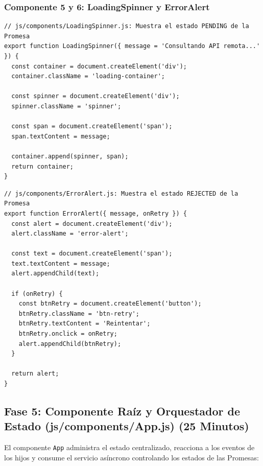 \documentclass[10pt,letterpaper]{article}
\begin{document}
\subsubsection{Componente 5 y 6: LoadingSpinner y ErrorAlert}
\begin{lstlisting}[style=jsstyle]
// js/components/LoadingSpinner.js: Muestra el estado PENDING de la Promesa
export function LoadingSpinner({ message = 'Consultando API remota...' }) {
  const container = document.createElement('div');
  container.className = 'loading-container';

  const spinner = document.createElement('div');
  spinner.className = 'spinner';

  const span = document.createElement('span');
  span.textContent = message;

  container.append(spinner, span);
  return container;
}
\end{lstlisting}

\begin{lstlisting}[style=jsstyle]
// js/components/ErrorAlert.js: Muestra el estado REJECTED de la Promesa
export function ErrorAlert({ message, onRetry }) {
  const alert = document.createElement('div');
  alert.className = 'error-alert';

  const text = document.createElement('span');
  text.textContent = message;
  alert.appendChild(text);

  if (onRetry) {
    const btnRetry = document.createElement('button');
    btnRetry.className = 'btn-retry';
    btnRetry.textContent = 'Reintentar';
    btnRetry.onclick = onRetry;
    alert.appendChild(btnRetry);
  }

  return alert;
}
\end{lstlisting}

\subsection{Fase 5: Componente Raíz y Orquestador de Estado (js/components/App.js) (25 Minutos)}
El componente \texttt{App} administra el estado centralizado, reacciona a los eventos de los hijos y consume el servicio asíncrono controlando los estados de las Promesas:
\end{document}
